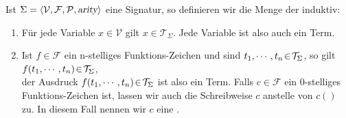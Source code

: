 \begin{Definition}
  Ist $\Sigma = \langle \mathcal{V}, \mathcal{F}, \mathcal{P}, \textsl{arity} \rangle$ eine Signatur, so definieren wir die Menge der 
   induktiv:
  \begin{enumerate}
  \item Für jede Variable $x \in \mathcal{V}$ gilt $x \in \mathcal{T}_\Sigma$.  Jede Variable ist also auch
        ein Term.
  \item Ist $f \in \mathcal{F}$ ein n-stelliges Funktions-Zeichen und sind 
        $t_1,\cdots,t_n \!\in\! \mathcal{T}_\Sigma$, so gilt 
        \\[0.2cm]
        \hspace*{1.3cm} $f(t_1,\cdots,t_n) \!\in\! \mathcal{T}_\Sigma$,
        \\[0.2cm]
        der Ausdruck  $f(t_1,\cdots,t_n) \!\in\! \mathcal{T}_\Sigma$ ist also ein Term.
        Falls $c \in \mathcal{F}$ ein 0-stelliges Funktions-Zeichen ist, lassen wir auch die Schreibweise
        $c$ anstelle von $c()$ zu.  In diesem Fall nennen wir $c$ eine .
        \eox
  \end{enumerate}
\end{Definition}

